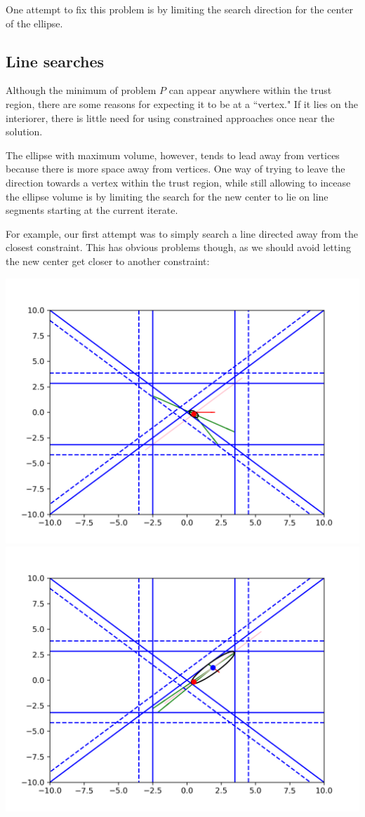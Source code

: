\documentclass{article}
\begin{document}
One attempt to fix this problem is by limiting the search direction for the center of the ellipse.

\subsection{Line searches}
Although the minimum of problem $P$ can appear anywhere within the trust region, there are some reasons for expecting it to be at a ``vertex."
If it lies on the interiorer, there is little need for using constrained approaches once near the solution.

The ellipse with maximum volume, however, tends to lead away from vertices because there is more space away from vertices.
One way of trying to leave the direction towards a vertex within the trust region, while still allowing to incease the ellipse volume is by limiting the search for the new center to lie on line segments starting at the current iterate.

For example, our first attempt was to simply search a line directed away from the closest constraint.
This has obvious problems though, as we should avoid letting the new center get closer to another constraint:

\includegraphics[scale=0.4]{line_1.png}
\includegraphics[scale=0.4]{line_2.png}
\end{document}

